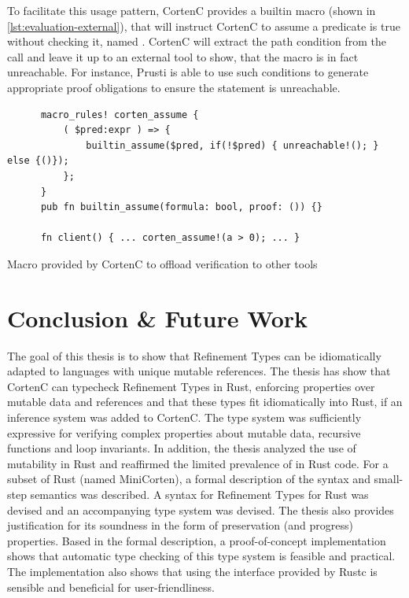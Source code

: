 \documentclass[twoside, english]{sdqthesis}
\theoremstyle{definition}
\begin{document}
To facilitate this usage pattern, CortenC provides a builtin macro (shown in \cref{lst:evaluation-external}), that will instruct CortenC to assume a predicate is true without checking it, named . CortenC will extract the path condition from the call and leave it up to an external tool to show, that the  macro is in fact unreachable. For instance, Prusti\cite{astrauskas_leveraging_2019} is able to use such conditions to generate appropriate proof obligations to ensure the statement is unreachable.


\begin{listing}[h]
  \begin{minipage}[t]{0.48\linewidth}
    \begin{verbatim}
      macro_rules! corten_assume {
          ( $pred:expr ) => {
              builtin_assume($pred, if(!$pred) { unreachable!(); } else {()});
          };
      }
      pub fn builtin_assume(formula: bool, proof: ()) {}

      fn client() { ... corten_assume!(a > 0); ... }
    \end{verbatim}
  \end{minipage}
  \caption{Macro provided by CortenC to offload verification to other tools}
  \label{lst:evaluation-external}
\end{listing}



\chapter{Conclusion \& Future Work} \label{ch:conclusion}

The goal of this thesis is to show that Refinement Types can be idiomatically adapted to languages with unique mutable references. 
The thesis has show that CortenC can typecheck Refinement Types in Rust, enforcing properties over mutable data and references and that these types fit idiomatically into Rust, if an inference system was added to CortenC.
The type system was sufficiently expressive for verifying complex properties about mutable data, recursive functions and loop invariants. 
In addition, the thesis analyzed the use of mutability in Rust and reaffirmed the limited prevalence of  in Rust code.
For a subset of Rust (named MiniCorten), a formal description of the syntax and small-step semantics was described.
A syntax for Refinement Types for Rust was devised and an accompanying type system was devised. The thesis also provides justification for its soundness in the form of preservation (and progress) properties.
Based in the formal description, a proof-of-concept implementation shows that automatic type checking of this type system is feasible and practical. The implementation also shows that using the interface provided by Rustc is sensible and beneficial for user-friendliness.
\end{document}

